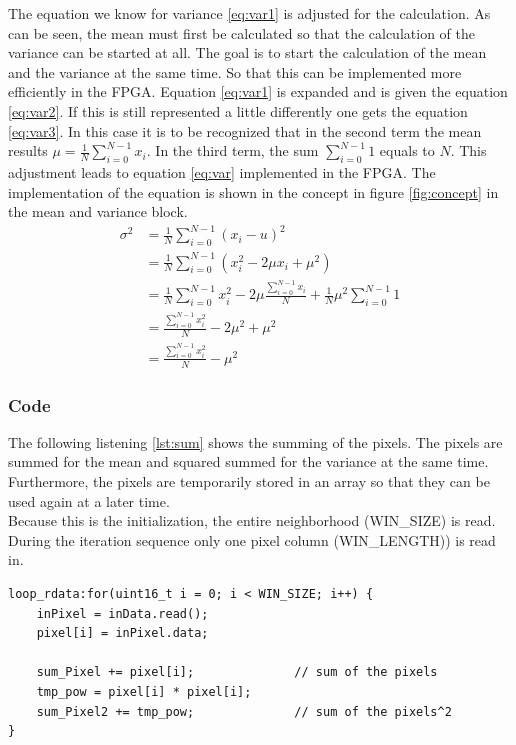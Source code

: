 The equation we know for variance \ref{eq:var1} is adjusted for the calculation.
As can be seen, the mean must first be calculated so that the calculation of the
variance can be started at all. The goal is to start the calculation of the mean
and the variance at the same time. So that this can be implemented more
efficiently in the FPGA.
Equation \ref{eq:var1} is expanded and is given the equation \ref{eq:var2}. If
this is still represented a little differently one gets the equation 
\ref{eq:var3}. In this case it is to be recognized that in the second term the
mean results $\mu = \frac{1}{N} \sum_{i = 0}^{N - 1} x_{i}$. In the third term,
the sum $\sum_{i = 0}^{N - 1} 1$ equals to $N$.
This adjustment leads to equation \ref{eq:var} implemented in the FPGA. The implementation of the equation is shown in the concept in figure \ref{fig:concept} in the mean and variance block.
\begin{align}
    \sigma^{2} & = \frac{1}{N} \sum_{i = 0}^{N - 1} (x_{i} - u)^{2} \label{eq:var1}\\ 
    		& = \frac{1}{N} \sum_{i = 0}^{N - 1} (x_{i}^{2} - 2 \mu x_{i} + \mu^{2})  \label{eq:var2}\\
    		& = \frac{1}{N} \sum_{i = 0}^{N - 1} x_{i}^{2} - 2\mu \frac{\sum_{i = 0}^{N - 1} x_{i}}{N} + \frac{1}{N} \mu^{2} \sum_{i = 0}^{N - 1} 1 \label{eq:var3}\\
    		& = \frac{\sum_{i = 0}^{N - 1} x_{i}^{2}}{N}  - 2\mu^{2} + \mu^{2} \label{eq:var4}\\
    		& = \frac{\sum_{i = 0}^{N - 1} x_{i}^{2}}{N}  - \mu^{2}
    \label{eq:var}
\end{align}

\subsubsection*{Code}
The following listening \ref{lst:sum} shows the summing of the pixels. The pixels are summed for the mean and squared summed for the variance at the same time. Furthermore, the pixels are temporarily stored in an array so that they can be used again at a later time. \\
Because this is the initialization, the entire neighborhood (WIN\_SIZE) is read. During the iteration sequence only one pixel column (WIN\_LENGTH)) is read in. \\
\begin{minipage}{\textwidth}
\begin{lstlisting}[style=CStyle, caption=Calculation of the sum, label=lst:sum]
loop_rdata:for(uint16_t i = 0; i < WIN_SIZE; i++) {
	inPixel = inData.read();
	pixel[i] = inPixel.data;

	sum_Pixel += pixel[i];				// sum of the pixels
	tmp_pow = pixel[i] * pixel[i];
	sum_Pixel2 += tmp_pow;				// sum of the pixels^2
}
\end{lstlisting}
\end{minipage}

